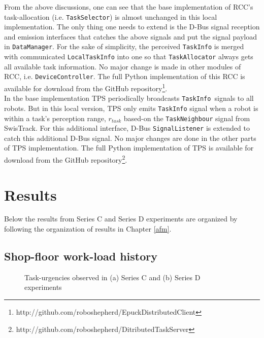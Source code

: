 From the above discussions, one can see that the base implementation of RCC's task-allocation (i.e. \texttt{TaskSelector}) is almost unchanged in this local implementation. The only thing one needs to extend is the D-Bus signal reception and emission interfaces that catches the above signals and put the signal payload in \texttt{DataManager}. For the sake of simplicity, the perceived \texttt{TaskInfo} is merged with communicated \texttt{LocalTaskInfo} into one so that \texttt{TaskAllocator} always gets all available task information. No major change is made in other modules of RCC, i.e. \texttt{DeviceController}. The full Python implementation of this RCC is available for download from the GitHub repository\footnote{http://github.com/roboshepherd/EpuckDistributedClient }.\\ 
In the base implementation TPS periodically broadcasts \texttt{TaskInfo }signals to all robots. But in this local version, TPS only emits \texttt{TaskInfo} signal when a robot is within a task's perception range, $r_{task}$ based-on the \texttt{TaskNeighbour} signal from SwisTrack. For this additional interface, D-Bus \texttt{SignalListener} is extended to catch this additional D-Bus signal.  No major changes are done in the other parts of TPS implementation. The full Python implementation of TPS is available for download from the GitHub repository\footnote{http://github.com/roboshepherd/DitributedTaskServer}.
\section{Results}
\label{sec:results}
Below the results from Series C and Series D experiments are organized by following the organization of results in Chapter \ref{afm}.
\subsection*{Shop-floor work-load history}
\begin{figure}[H]
\centering
\hspace*{0.5cm}
\newline
{}
\caption{\small Task-urgencies observed in (a) Series C and (b) Series D experiments}
\label{fig:raw-urgencies-SC-SD} 
\end{figure}

